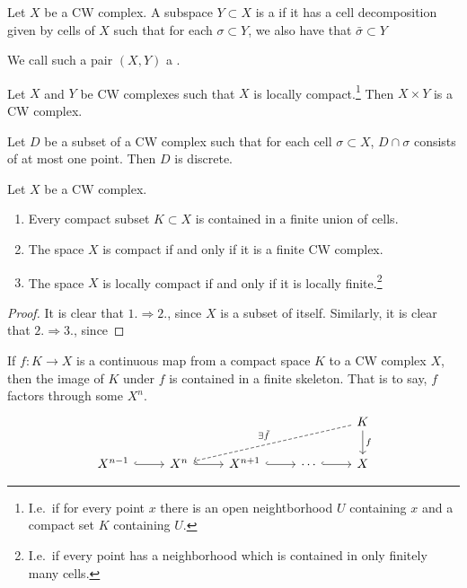 \documentclass[main.tex]{subfiles}
\begin{document}
\begin{definition}
  \label{def:subcomplex}
  Let $X$ be a CW complex. A subspace $Y \subset X$ is a  if it has a cell decomposition given by cells of $X$ such that for each $\sigma \subset Y$, we also have that $\bar{\sigma} \subset Y$

  We call such a pair $(X, Y)$ a .
\end{definition}

\begin{fact}
  \label{fact:product_of_cw_complexes}
  Let $X$ and $Y$ be CW complexes such that $X$ is locally compact.\footnote{I.e.\ if for every point $x$ there is an open neightborhood $U$ containing $x$ and a compact set $K$ containing $U$.} Then $X \times Y$ is a CW complex.
\end{fact}

\begin{lemma}
  \label{lemma:subset_intersecting_each_cell_once_discrete}
  Let $D$ be a subset of a CW complex such that for each cell $\sigma \subset X$, $D \cap \sigma$ consists of at most one point. Then $D$ is discrete.
\end{lemma}

\begin{corollary}
  Let $X$ be a CW complex.
  \begin{enumerate}
    \item Every compact subset $K \subset X$ is contained in a finite union of cells.

    \item The space $X$ is compact if and only if it is a finite CW complex.

    \item The space $X$ is locally compact if and only if it is locally finite.\footnote{I.e.\ if every point has a neighborhood which is contained in only finitely many cells.}
  \end{enumerate}
\end{corollary}
\begin{proof}
  It is clear that $1. \Rightarrow 2.$, since $X$ is a subset of itself. Similarly, it is clear that $2. \Rightarrow 3.$, since
\end{proof}

\begin{corollary}
  \label{cor:map_of_compact_into_CW_factors_through_some_skeleton}
  If $f\colon K \to X$ is a continuous map from a compact space $K$ to a CW complex $X$, then the image of $K$ under $f$ is contained in a finite skeleton. That is to say, $f$ factors through some $X^{n}$.
  \begin{equation*}
    \begin{tikzcd}
      &&&& K
      \arrow[d, "f"]
      \arrow[dlll, dashed, swap, "\exists \tilde{f}"]
      \\
      X^{n-1}
      \arrow[r, hook]
      & X^{n}
      \arrow[r, hook]
      & X^{n+1}
      \arrow[r, hook]
      & \cdots
      \arrow[r, hook]
      & X
    \end{tikzcd}
  \end{equation*}
\end{corollary}
\end{document}
